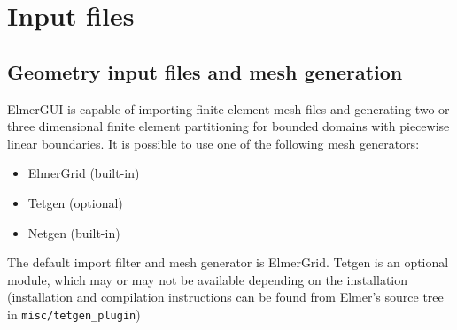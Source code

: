 





\chapter{Input files}

\section{Geometry input files and mesh generation}

ElmerGUI is capable of importing finite element mesh files and generating two or three
dimensional finite element partitioning for bounded domains with piecewise linear
boundaries. It is possible to use one of the following mesh generators:
\begin{itemize}
 \item ElmerGrid (built-in)
 \item Tetgen (optional)
 \item Netgen (built-in)
\end{itemize}
The default import filter and mesh generator is ElmerGrid. Tetgen is an optional
module, which may or may not be available depending on the installation (installation and
compilation instructions can be found from Elmer's source tree in {\tt misc/tetgen\_plugin})

